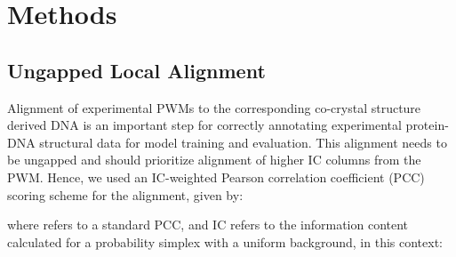 \section{Methods}
\subsection{Ungapped Local Alignment}
Alignment of experimental PWMs to the corresponding co-crystal structure derived DNA is an important step for correctly annotating experimental protein-DNA structural data for model training and evaluation. This alignment needs to be ungapped and should prioritize alignment of higher IC columns from the PWM. Hence, we used an IC-weighted Pearson correlation coefficient (PCC) scoring scheme for the alignment, given by:


where  refers to a standard PCC, and IC refers to the information content calculated for a probability simplex with a uniform background, in this context:



